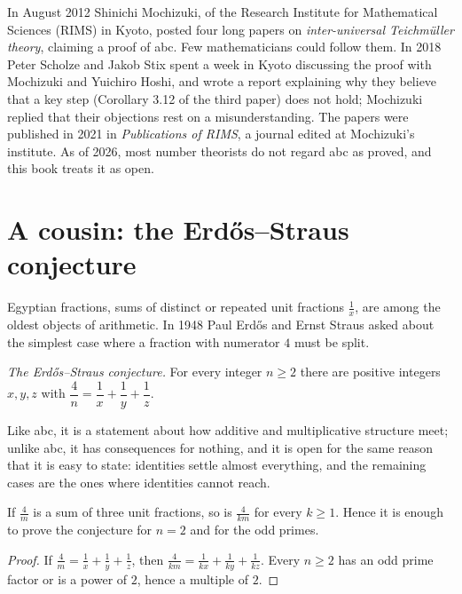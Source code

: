 \begin{remark}\label{rem:mochizuki}
In August 2012 Shinichi Mochizuki, of the Research Institute for Mathematical Sciences (RIMS) in Kyoto, posted four long papers on
\emph{inter-universal Teichm\"uller theory}, claiming a proof of abc. Few mathematicians could follow them. In 2018 Peter Scholze and Jakob Stix
spent a week in Kyoto discussing the proof with Mochizuki and Yuichiro Hoshi, and wrote a report explaining why they believe that a key step (Corollary
3.12 of the third paper) does not hold; Mochizuki replied that their objections rest on a misunderstanding. The papers were published in 2021 in
\emph{Publications of RIMS}, a journal edited at Mochizuki's institute. As of 2026, most number theorists do not regard abc as proved, and this book
treats it as open.
\end{remark}

\section{A cousin: the Erd\H os--Straus conjecture}

Egyptian fractions, sums of distinct or repeated unit fractions $\frac1x$, are among the oldest objects of arithmetic. In 1948 Paul Erd\H os and Ernst
Straus asked about the simplest case where a fraction with numerator $4$ must be split.

\begin{center}
\emph{The Erd\H os--Straus conjecture.} For every integer $n\ge2$ there are positive integers $x,y,z$ with $\dfrac4n=\dfrac1x+\dfrac1y+\dfrac1z$.
\end{center}

Like abc, it is a statement about how additive and multiplicative structure meet; unlike abc, it has consequences for nothing, and it is open for the
same reason that it is easy to state: identities settle almost everything, and the remaining cases are the ones where identities cannot reach.

\begin{proposition}\label{prop:esreduce}
If $\frac4m$ is a sum of three unit fractions, so is $\frac4{km}$ for every $k\ge1$. Hence it is enough to prove the conjecture for $n=2$ and for the
odd primes.
\end{proposition}
\begin{proof}
If $\frac4m=\frac1x+\frac1y+\frac1z$, then $\frac4{km}=\frac1{kx}+\frac1{ky}+\frac1{kz}$. Every $n\ge2$ has an odd prime factor or is a power of $2$, hence a
multiple of $2$.
\end{proof}

